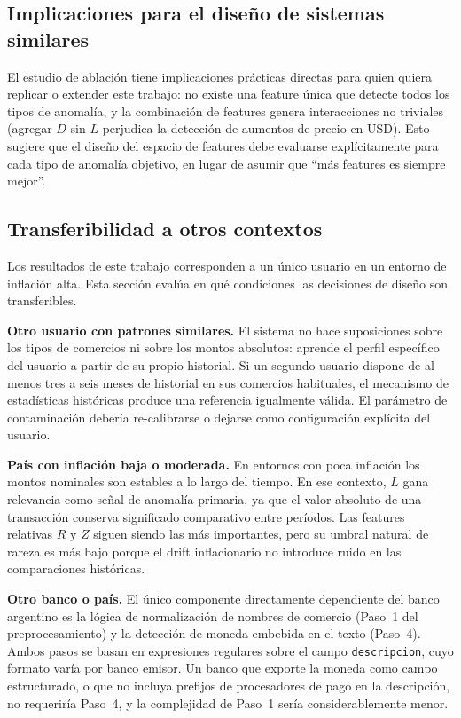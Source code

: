 \documentclass[conference]{IEEEtran}
\begin{document}
\subsection{Implicaciones para el dise\~no de sistemas similares}

El estudio de ablaci\'on tiene implicaciones pr\'acticas directas para quien quiera
replicar o extender este trabajo: no existe una feature \'unica que detecte todos los
tipos de anomal\'ia, y la combinaci\'on de features genera interacciones no triviales
(agregar $D$ sin $L$ perjudica la detecci\'on de aumentos de precio en USD). Esto
sugiere que el dise\~no del espacio de features debe evaluarse expl\'icitamente para
cada tipo de anomal\'ia objetivo, en lugar de asumir que ``m\'as features es siempre
mejor''.

\subsection{Transferibilidad a otros contextos}

Los resultados de este trabajo corresponden a un \'unico usuario en un entorno de
inflaci\'on alta. Esta secci\'on eval\'ua en qu\'e condiciones las decisiones de
dise\~no son transferibles.

\textbf{Otro usuario con patrones similares.}  El sistema no hace suposiciones sobre
los tipos de comercios ni sobre los montos absolutos: aprende el perfil espec\'ifico
del usuario a partir de su propio historial. Si un segundo usuario dispone de al menos
tres a seis meses de historial en sus comercios habituales, el mecanismo de
estad\'isticas hist\'oricas produce una referencia igualmente v\'alida. El par\'ametro
de contaminaci\'on deber\'ia re-calibrarse o dejarse como configuraci\'on expl\'icita
del usuario.

\textbf{Pa\'is con inflaci\'on baja o moderada.}  En entornos con poca inflaci\'on
los montos nominales son estables a lo largo del tiempo. En ese contexto, $L$ gana
relevancia como se\~nal de anomal\'ia primaria, ya que el valor absoluto de una
transacci\'on conserva significado comparativo entre per\'iodos. Las features
relativas $R$ y $Z$ siguen siendo las m\'as importantes, pero su umbral natural de
rareza es m\'as bajo porque el drift inflacionario no introduce ruido en las
comparaciones hist\'oricas.

\textbf{Otro banco o pa\'is.}  El \'unico componente directamente dependiente del
banco argentino es la l\'ogica de normalizaci\'on de nombres de comercio (Paso~1 del
preprocesamiento) y la detecci\'on de moneda embebida en el texto (Paso~4). Ambos
pasos se basan en expresiones regulares sobre el campo \texttt{descripcion}, cuyo
formato var\'ia por banco emisor. Un banco que exporte la moneda como campo
estructurado, o que no incluya prefijos de procesadores de pago en la descripci\'on,
no requerir\'ia Paso~4, y la complejidad de Paso~1 ser\'ia considerablemente menor.
\end{document}
